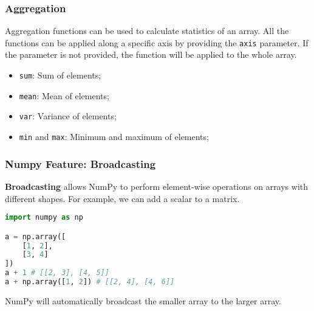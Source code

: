 \documentclass[beamer, en, version=2.0]{huangfusl-template}
\begin{document}
    \begin{frame}[fragile]
        \frametitle{Aggregation}

        Aggregation functions can be used to calculate statistics of an array. All the functions can be applied along a specific axis by providing the {\color{blue}\footnotesize\verb|axis|} parameter. If the parameter is not provided, the function will be applied to the whole array.

        \begin{itemize}
            \item {\color{blue}\footnotesize\verb|sum|:} Sum of elements;
            \item {\color{blue}\footnotesize\verb|mean|:} Mean of elements;
            \item {\color{blue}\footnotesize\verb|var|:} Variance of elements;
            \item {\color{blue}\footnotesize\verb|min|} and {\color{blue}\footnotesize\verb|max|:} Minimum and maximum of elements;
        \end{itemize}
    \end{frame}
    \begin{frame}[fragile]
        \frametitle{Numpy Feature: Broadcasting}

        \textbf{Broadcasting} allows NumPy to perform element-wise operations on arrays with different shapes. For example, we can add a scalar to a matrix.

\begin{lstlisting}[language=python]
import numpy as np

a = np.array([
    [1, 2],
    [3, 4]
])
a + 1 # [[2, 3], [4, 5]]
a + np.array([1, 2]) # [[2, 4], [4, 6]]
\end{lstlisting}

        NumPy will automatically broadcast the smaller array to the larger array.
    \end{frame}
\end{document}
